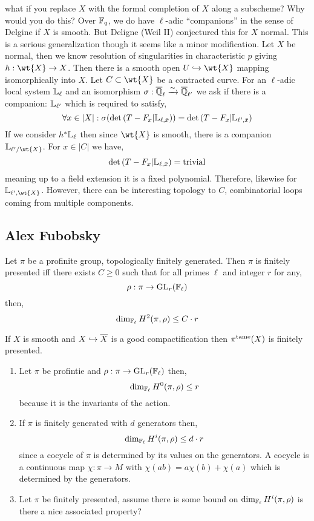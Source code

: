 \documentclass[12pt]{article}
\begin{document}
what if you replace $X$ with the formal completion of $X$ along a subscheme? Why would you do this? Over $\mathbb{F}_q$, we do have $\ell$-adic ``companions'' in the sense of Delgine if $X$ is smooth. But Deligne (Weil II) conjectured this for $X$ normal. This is a serious generalization though it seems like a minor modification. Let $X$ be normal, then we know resolution of singularities in characteristic $p$ giving $h : \wt{X} \to X$. Then there is a smooth open $U \embed \wt{X}$ mapping isomorphically into $X$. Let $C \subset \wt{X}$ be a contracted curve. For an $\ell$-adic local system $\mathbb{L}_{\ell}$ and an isomorphism $\sigma : \overline{\mathbb{Q}}_{\ell} \xrightarrow{\sim} \overline{\mathbb{Q}}_{\ell'}$ we ask if there is a companion: $\mathbb{L}_{\ell'}$ which is required to satisfy,
\[ \forall x \in |X| : \sigma(\det{(T - F_x | \mathbb{L}_{\ell, \bar{x}})}) = \det{(T - F_x | \mathbb{L}_{\ell', \bar{x}})} \]
If we consider $h^* \mathbb{L}_{\ell}$ then since $\wt{X}$ is smooth, there is a companion $\LL_{\ell'/\wt{X}}$. For $x \in |C|$ we have,
\[ \det{(T - F_x | \mathbb{L}_{\ell, \bar{x}})} = \text{trivial} \]
meaning up to a field extension it is a fixed polynomial. Therefore, likewise for $\LL_{\ell', \wt{X}}$. However, there can be interesting topology to $C$, combinatorial loops coming from multiple components.

\subsection{Alex Fubobsky}

\begin{theorem}
Let $\pi$ be a profinite group, topologically finitely generated. Then $\pi$ is finitely presented iff there exists $C \ge 0$ such that for all primes $\ell$ and integer $r$ for any,
\[ \rho : \pi \to \mathrm{GL}_r(\mathbb{F}_\ell) \]
then,
\[ \dim_{\mathbb{F}_\ell} H^2(\pi, \rho) \le C \cdot r \]
\end{theorem}

\begin{cor}
If $X$ is smooth and $X \hookrightarrow \overline{X}$ is a good compactification then $\pi^{\mathrm{tame}}(X)$ is finitely presented.
\end{cor}

\begin{enumerate}
\item Let $\pi$ be profintie and $\rho : \pi \to \mathrm{GL}_r(\mathbb{F}_\ell)$ then,
\[ \dim_{\mathbb{F}_\ell} H^0(\pi, \rho) \le r \]
because it is the invariants of the action. 

\item If $\pi$ is finitely generated with $d$ generators then,
\[ \dim_{\mathbb{F}_\ell} H^i(\pi, \rho) \le d \cdot r \]
since a cocycle of $\pi$ is determined by its values on the generators. A cocycle is a continuous map $\chi : \pi \to M$ with $\chi(ab) = a \chi(b) + \chi(a)$ which is determined by the generators.

\item Let $\pi$ be finitely presented, assume there is some bound on $\dim_{\mathbb{F}_\ell} H^i(\pi, \rho)$ is there a nice associated property? 
\end{enumerate}
\end{document}

